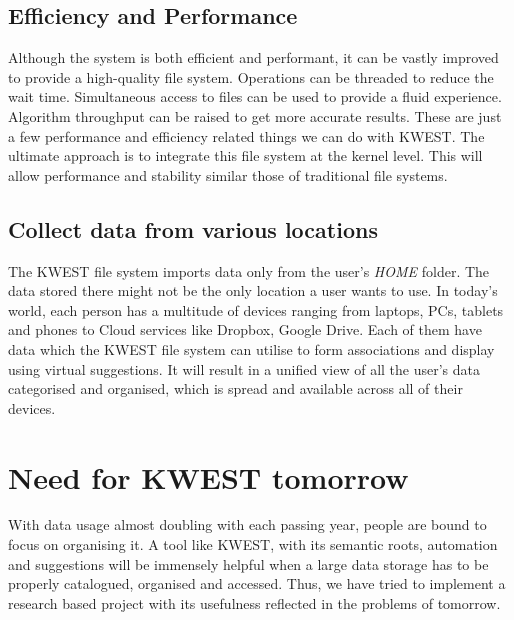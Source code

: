 \subsection*{Efficiency and Performance}
Although the system is both efficient and performant, it can be vastly improved to provide a high-quality file system. Operations can be threaded to reduce the wait time. Simultaneous access to files can be used to provide a fluid experience. Algorithm throughput can be raised to get more accurate results. These are just a few performance and efficiency related things we can do with KWEST. The ultimate approach is to integrate this file system at the kernel level. This will allow performance and stability similar those of traditional file systems.

\subsection*{Collect data from various locations}
The KWEST file system imports data only from the user's \textit{HOME} folder. The data stored there might not be the only location a user wants to use. In today's world, each person has a multitude of devices ranging from laptops, PCs, tablets and phones to Cloud services like Dropbox, Google Drive. Each of them have data which the KWEST file system can utilise to form associations and display using virtual suggestions. It will result in a unified view of all the user's data categorised and organised, which is spread and available across all of their devices.

\section{Need for KWEST tomorrow}
With data usage almost doubling with each passing year, people are bound to focus on organising it. A tool like KWEST,  with its semantic roots, automation and suggestions will be immensely helpful when a large data storage has to be properly catalogued, organised and accessed. Thus, we have tried to implement a research based project with its usefulness reflected in the problems of tomorrow.